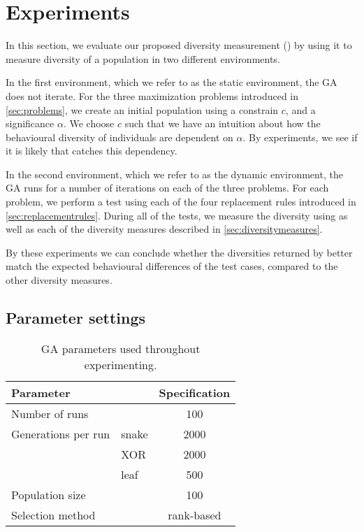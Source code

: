 \section{Experiments}\label{sec:experiments}
In this section, we evaluate our proposed diversity measurement (\dia) by using it to measure diversity of a population in two different environments.

In the first environment, which we refer to as the static environment, the GA does not iterate.
For the three maximization problems introduced in \cref{sec:problems}, we create an initial population using a constrain $c$, and a significance $\alpha$. We choose $c$ such that we have an intuition about how the behavioural diversity of individuals are dependent on $\alpha$. By experiments, we see if it is likely that \dia{} catches this dependency.

In the second environment, which we refer to as the dynamic environment, the GA runs for a number of iterations on each of the three problems. 
For each problem, we perform a test using each of the four replacement rules introduced in \cref{sec:replacementrules}.
During all of the tests, we measure the diversity using \dia{} as well as each of the diversity measures described in \cref{sec:diversitymeasures}.

By these experiments we can conclude whether the diversities returned by \dia{} better match the expected behavioural differences of the test cases, compared to the other diversity measures.

\subsection{Parameter settings}

\begin{table}
  \centering
  \begin{tabular}{l l S}
    \toprule
    Parameter & & {Specification} \\
    \midrule
    Number of runs & & 100 \\
    Generations per run & snake & 2000 \\
    & XOR & 2000 \\
    & leaf & 500 \\
    Population size & & 100 \\
    Selection method & & {rank-based} \\
    \bottomrule
  \end{tabular}
  \caption{GA parameters used throughout experimenting.}
  \label{tab:gaparam}
\end{table}

